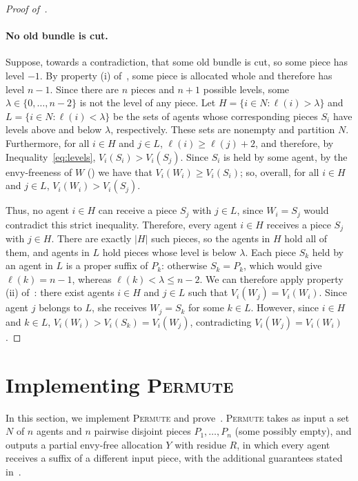 \documentclass[11pt]{article}
\newcommand{\Permute}{\textsc{Permute}}
\theoremstyle{plain}
\theoremstyle{definition}
\theoremstyle{plain}
\begin{document}
\begin{proof}[Proof of~]
\paragraph{No old bundle is cut.}
Suppose, towards a contradiction, that some old bundle is cut, so some piece has level $-1$. By property (i) of~, some piece is allocated whole and therefore has level $n-1$. Since there are $n$ pieces and $n+1$ possible levels, some $\lambda\in\{0,\dots,n-2\}$ is not the level of any piece. Let $H=\{i\in N:\ell(i)>\lambda\}$ and $L=\{i\in N:\ell(i)<\lambda\}$ be the sets of agents whose corresponding pieces $S_i$ have levels above and below $\lambda$, respectively. These sets are nonempty and partition $N$. Furthermore, for all $i\in H$ and $j\in L$, $\ell(i)\ge\ell(j)+2$, and therefore, by Inequality~\eqref{eq:levels}, $V_i(S_i)>V_i(S_j)$. Since $S_i$ is held by some agent, by the envy-freeness of $W$ () we have that $V_i(W_i)\ge V_i(S_i)$; so, overall, for all $i\in H$ and $j\in L$, $V_i(W_i) > V_i(S_j)$.

Thus, no agent $i\in H$ can receive a piece $S_j$ with $j \in L$, since $W_i=S_j$ would contradict this strict inequality. Therefore, every agent $i\in H$ receives a piece $S_j$ with $j\in H$. There are exactly $|H|$ such pieces, so the agents in $H$ hold all of them, and agents in $L$ hold pieces whose level is below $\lambda$. 
Each piece $S_k$ held by an agent in $L$ is a proper suffix of $P_k$: otherwise $S_k=P_k$, which would give $\ell(k)=n-1$, whereas $\ell(k)<\lambda\le n-2$. We can therefore apply property (ii) of~: there exist agents $i\in H$ and $j\in L$ such that $V_i(W_j)=V_i(W_i)$. Since agent $j$ belongs to $L$, she receives $W_j=S_k$ for some $k\in L$. However, since $i\in H$ and $k\in L$, $V_i(W_i)>V_i(S_k)=V_i(W_j)$, contradicting $V_i(W_j)=V_i(W_i)$.
\end{proof}

\section{Implementing \Permute}\label{sec:permute}

In this section, we implement \Permute{} and prove~. \Permute{} takes as input a set $N$ of $n$ agents and $n$ pairwise disjoint pieces $P_1,\dots,P_n$ (some possibly empty), and outputs a partial envy-free allocation $Y$ with residue $R$, in which every agent receives a suffix of a different input piece, with the additional guarantees stated in~.
\end{document}

